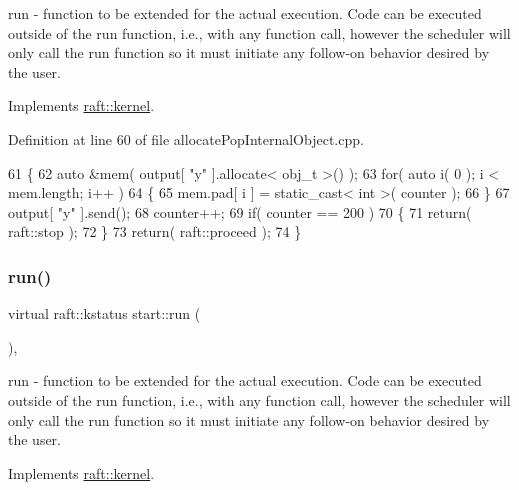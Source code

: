 run -\/ function to be extended for the actual execution. Code can be executed outside of the run function, i.\+e., with any function call, however the scheduler will only call the run function so it must initiate any follow-\/on behavior desired by the user. 

Implements \hyperlink{classraft_1_1kernel_a05094286d7577360fb1b91c91fc05901}{raft\+::kernel}.



Definition at line 60 of file allocate\+Pop\+Internal\+Object.\+cpp.


\begin{DoxyCode}
61     \{
62         \textcolor{keyword}{auto} &mem( output[ \textcolor{stringliteral}{"y"} ].allocate< obj\_t >() );
63         \textcolor{keywordflow}{for}( \textcolor{keyword}{auto} i( 0 ); i < mem.length; i++ )
64         \{
65             mem.pad[ i ] = \textcolor{keyword}{static\_cast<} \textcolor{keywordtype}{int} \textcolor{keyword}{>}( counter );
66         \}
67         output[ \textcolor{stringliteral}{"y"} ].send();
68         counter++;
69         \textcolor{keywordflow}{if}( counter == 200 )
70         \{
71             \textcolor{keywordflow}{return}( raft::stop );
72         \}
73         \textcolor{keywordflow}{return}( raft::proceed );
74     \}
\end{DoxyCode}
\hypertarget{classstart_a4c076d756e2846f51e54452853a9ed6d}{}\label{classstart_a4c076d756e2846f51e54452853a9ed6d} 
\subsubsection{\texorpdfstring{run()}{run()}\hspace{0.1cm}{\footnotesize\ttfamily [6/6]}}
{\footnotesize\ttfamily virtual raft\+::kstatus start\+::run (\begin{DoxyParamCaption}{ }\end{DoxyParamCaption})\hspace{0.3cm}{\ttfamily [inline]}, {\ttfamily [virtual]}}

run -\/ function to be extended for the actual execution. Code can be executed outside of the run function, i.\+e., with any function call, however the scheduler will only call the run function so it must initiate any follow-\/on behavior desired by the user. 

Implements \hyperlink{classraft_1_1kernel_a05094286d7577360fb1b91c91fc05901}{raft\+::kernel}.



